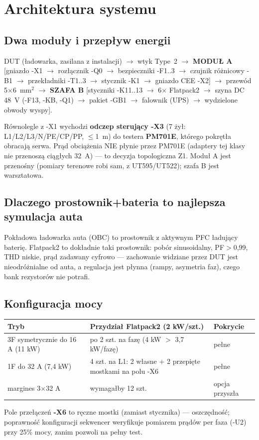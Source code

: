 \documentclass[11pt,a4paper]{article}
\begin{document}
\section{Architektura systemu}
\subsection{Dwa moduły i przepływ energii}
\begin{center}\small
DUT (ładowarka, zasilana z instalacji) $\to$ wtyk Type~2 $\to$ \textbf{MODUŁ A} [gniazdo -X1 $\to$
rozłącznik -Q0 $\to$ bezpieczniki -F1..3 $\to$ czujnik różnicowy -B1 $\to$ przekładniki -T1..3 $\to$
stycznik -K1 $\to$ gniazdo CEE -X2] $\to$ przewód 5$\times$6~mm$^2$ $\to$ \textbf{SZAFA B}
[styczniki -K11..13 $\to$ 6$\times$ Flatpack2 $\to$ szyna DC 48~V (-F13, -KB, -Q1) $\to$ pakiet
-GB1 $\to$ falownik (UPS) $\to$ wydzielone obwody wyspy].
\end{center}
Równolegle z -X1 wychodzi \textbf{odczep sterujący -X3} (7 żył: L1/L2/L3/N/PE/CP/PP, $\le$1~m) do
testera \textbf{PM701E}, którego pokrętła obracają serwa. Prąd obciążenia NIE płynie przez PM701E
(adaptery tej klasy nie przenoszą ciągłych 32~A) --- to decyzja topologiczna Z1. Moduł A jest
przenośny (pomiary terenowe robi sam, z UT595/UT522); szafa B jest warsztatowa.
\subsection{Dlaczego prostownik+bateria to najlepsza symulacja auta}
Pokładowa ładowarka auta (OBC) to prostownik z aktywnym PFC ładujący baterię. Flatpack2 to
dokładnie taki prostownik: pobór sinusoidalny, PF$>$0,99, THD niskie, prąd zadawany cyfrowo ---
zachowanie widziane przez DUT jest nieodróżnialne od auta, a regulacja jest płynna (rampy,
asymetria faz), czego bank rezystorów nie potrafi.
\subsection{Konfiguracja mocy}
\begin{longtable}{@{}p{}p{}p{}@{}}
\toprule
\textbf{Tryb} & \textbf{Przydział Flatpack2 (2 kW/szt.)} & \textbf{Pokrycie}\\
\midrule
3F symetrycznie do 16 A (11 kW) & po 2 szt. na fazę (4 kW $>$ 3,7 kW/fazę) & pełne\\
1F do 32 A (7,4 kW) & 4 szt. na L1: 2 własne $+$ 2 przepięte mostkami na polu -X6 & pełne\\
margines 3$\times$32 A & wymagałby 12 szt. & opcja przyszła\\
\bottomrule
\end{longtable}
Pole przełączeń \textbf{-X6} to ręczne mostki (zamiast stycznika) --- oszczędność; poprawność
konfiguracji sekwencer weryfikuje pomiarem prądów per faza (-U2) przy 25\% mocy, zanim pozwoli
na pełny test.
\end{document}
